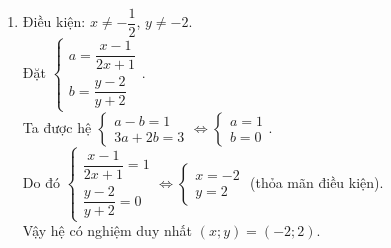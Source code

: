 \begin{bt}
{\begin{enumerate}
			Ta được hệ $\begin{cases} 4a + b = 5\\ a - 2b = -1\end{cases} \Leftrightarrow \begin{cases} a = 1\\ b = 1\end{cases}$. \\
			Do đó $\begin{cases} \dfrac{1}{x-2} = 1\\ \dfrac{1}{x+2y} = 1\end{cases} \Leftrightarrow \begin{cases} x = 3\\ y = -1\end{cases}$ (thỏa mãn điều kiện).\\
			Vậy hệ có nghiệm duy nhất $\left(x;y\right) = \left(3;-1\right)$.
			\item 
			Điều kiện: $x \ne -\dfrac{1}{2}$, $y \ne -2$.\\
			Đặt $\begin{cases} a = \dfrac{x-1}{2x+1}\\ b = \dfrac{y-2}{y+2}\end{cases}$. \\
			Ta được hệ $\begin{cases} a - b = 1\\ 3a + 2b = 3\end{cases} \Leftrightarrow \begin{cases} a = 1\\ b = 0\end{cases}$. \\
			Do đó $\begin{cases} \dfrac{x-1}{2x+1} = 1\\ \dfrac{y-2}{y+2} = 0\end{cases} \Leftrightarrow \begin{cases} x = -2\\ y = 2\end{cases}$ (thỏa mãn điều kiện).\\
			Vậy hệ có nghiệm duy nhất $\left(x;y\right) = \left(-2;2\right)$.
		\end{enumerate}
	}
\end{bt}

